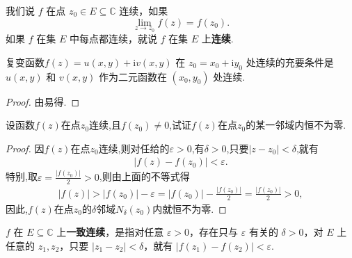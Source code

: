 \documentclass[../../main.tex]{subfiles}%
\begin{document}
\begin{definition}
我们说 $f$ 在点 $z_0 \in E\subseteq \mathbb{C}$ 连续，如果
\[
\lim_{z \to z_0} f(z) = f(z_0).
\]
如果 $f$ 在集 $E$ 中每点都连续，就说 $f$ 在集 $E$ 上\textbf{连续}.
\end{definition}

\begin{theorem}
复变函数$f(z) = u(x, y) + \mathrm{i}v(x, y)$ 在 $z_0 = x_0 + \mathrm{i}y_0$ 处连续的充要条件是 $u(x, y)$ 和 $v(x, y)$ 作为二元函数在 $(x_0, y_0)$ 处连续.
\end{theorem}
\begin{proof}
由易得.
\end{proof}

\begin{proposition}\label{proposition:复变函数---命题1.32}
设函数$f(z)$在点$z_0$连续,且$f(z_0)\neq0$,试证$f(z)$在点$z_0$的某一邻域内恒不为零.
\end{proposition}
\begin{proof}
因$f(z)$在点$z_0$连续,则对任给的$\varepsilon>0$,有$\delta>0$,只要$|z-z_0|<\delta$,就有
\begin{align*}
|f(z)-f(z_0)|<\varepsilon.
\end{align*}
特别,取$\varepsilon=\frac{|f(z_0)|}{2}>0$,则由上面的不等式得
\begin{align*}
|f(z)|>|f(z_0)|-\varepsilon=|f(z_0)|-\frac{|f(z_0)|}{2}=\frac{|f(z_0)|}{2}>0,
\end{align*}
因此,$f(z)$在点$z_0$的$\delta$邻域$N_\delta(z_0)$内就恒不为零.
\end{proof}

\begin{definition}
$f$ 在 $E\subseteq \mathbb{C}$ 上\textbf{一致连续}，是指对任意 $\varepsilon > 0$，存在只与 $\varepsilon$ 有关的 $\delta > 0$，对 $E$ 上任意的 $z_1, z_2$，只要 $|z_1 - z_2| < \delta$，就有 $|f(z_1) - f(z_2)| < \varepsilon$.
\end{definition}
\end{document}
